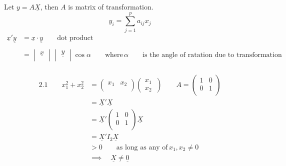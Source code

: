 \documentclass[11pt,a4paper]{article}
\theoremstyle{definition}
\begin{document}
\begin{enumerate}
Let $y= A\underline{X}$, then $A$ is matrix of transformation.  $$y_i = \sum^p_{j=1} a_{ij}x_j$$
\begin{align*}
\underline{x}'\underline{y} & = \underline{x}\cdot \underline{y}\qquad\text{dot product}\\\\
& = \begin{vmatrix}
\underline{x}\\
\end{vmatrix}\begin{vmatrix}
\underline{y}\\
\end{vmatrix}\cos \alpha\qquad \text{where}\,\alpha\qquad\text{is the angle of ratation due to transformation}\\
\end{align*}

\begin{align*}
2.1\qquad  x^2_1 + x_2^2 & = 
\begin{pmatrix}
x_1 & x_2\\
\end{pmatrix}\begin{pmatrix}
x_1 \\
x_2\
\end{pmatrix}\qquad 
A= 
\begin{pmatrix}
1 & 0\\
0 & 1\\
\end{pmatrix}\\
& = \underline{X}'\underline{X}\\
& = \underline{X}'\begin{pmatrix}
1  & 0\\
0 & 1\\
\end{pmatrix}\underline{X}\\
& = \underline{X}' I_2 \underline{X}\\
& > 0\qquad\text{as long as any of} \, x_1,x_2\neq 0\\
& \implies\quad  \underline{X}\neq \underline{0}\\
\end{align*}



\end{enumerate}
\end{document}
